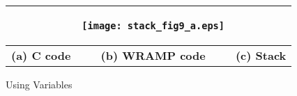 \begin{figure}[!hbtp]
\begin{center}
\begin{tabular}{|c|c|c|}
\begin{minipage}[t]{6cm}
\begin{scriptsize}
\begin{verbatim}
\end{verbatim}
\end{scriptsize}
\end{minipage}
&
\begin{minipage}[t]{5cm}
\begin{center}

\vspace{3.5cm}
\texttt{[image: stack\_fig9\_a.eps]}

\end{center}
\end{minipage}
\\
\hline
\textbf{(a) C code} & \textbf{(b) WRAMP code} & \textbf{(c) Stack}\\
\hline
\end{tabular}
\end{center}

\caption{Using Variables}
\label{var_example}
\end{figure}

